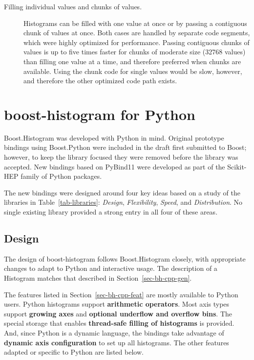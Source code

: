 \documentclass{webofc}
\begin{document}
\begin{description}
\item[Filling individual values and chunks of values.] Histograms can be filled with one value at once or by passing a contiguous chunk of values at once. Both cases are handled by separate code segments, which were highly optimized for performance. Passing contiguous chunks of values is up to five times faster for chunks of moderate size (32768 values) than filling one value at a time, and therefore preferred when chunks are available. Using the chunk code for single values would be slow, however, and therefore the other optimized code path exists.
\end{description}

\section{boost-histogram for Python}
\label{sec-bhp-intro}

Boost.Histogram was developed with Python in mind. Original prototype bindings using Boost.Python were included in the draft first submitted to Boost; however, to keep the library focused they were removed before the library was accepted. New bindings based on PyBind11 were developed as part of the Scikit-HEP family of Python packages.

The new bindings were designed around four key ideas based on a study of the libraries in Table~\ref{tab-libraries}: \emph{Design}, \emph{Flexibility}, \emph{Speed}, and \emph{Distribution}. No single existing library provided a strong entry in all four of these areas.

\subsection{Design}
\label{sec-bhp-design}

The design of boost-histogram follows Boost.Histogram closely, with appropriate changes to adapt to Python and interactive usage. The description of a Histogram matches that described in Section~\ref{sec-bh-cpp-gen}.

The features listed in Section~\ref{sec-bh-cpp-feat} are mostly available to Python users. Python histograms support \textbf{arithmetic operators}. Most axis types support \textbf{growing axes} and \textbf{optional underflow and overflow bins}. The special storage that enables \textbf{thread-safe filling of histograms} is provided. And, since Python is a dynamic language, the bindings take advantage of \textbf{dynamic axis configuration} to set up all histograms. The other features adapted or specific to Python are listed below.
\end{document}
